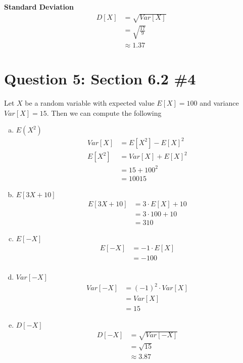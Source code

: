 \documentclass[11pt, oneside]{article}   	%
\begin{document}
\textbf{Standard Deviation}
\begin{align*}
	D[X] & = \sqrt{Var[X]} \\
	& = \sqrt{\frac{17}{9}} \\
	& \approx 1.37
\end{align*}

\section*{Question 5: Section 6.2 \#4}

Let $X$ be a random variable with expected value $E[X] = 100$ and variance $Var[X] = 15$. Then we can compute the following
\begin{enumerate}[(a)]
	\item $E(X^2)$
	\begin{align*}
		Var[X] & = E[X^2] - E[X]^2 \\
		E[X^2] & = Var[X] + E[X]^2\\
		& = 15 + 100^2 \\
		& = 10015
	\end{align*}
	
	\item $E[3X+10]$
	\begin{align*}
		E[3X+10] & = 3 \cdot E[X] + 10 \\
		& = 3 \cdot 100 + 10 \\
		& = 310
	\end{align*}
	
	\item $E[-X]$
	\begin{align*}
		E[-X] & = -1 \cdot E[X] \\
		& = -100 \\
	\end{align*}
	
	\item $Var[-X]$
	\begin{align*}
		Var[-X] & = (-1)^2 \cdot Var[X]\\
		& = Var[X] \\
		& = 15
	\end{align*}
	
	\item $D[-X]$
	\begin{align*}
		D[-X] & = \sqrt{Var[-X]} \\
		& = \sqrt{15} \\
		& \approx 3.87
	\end{align*}
\end{enumerate}
\end{document}
